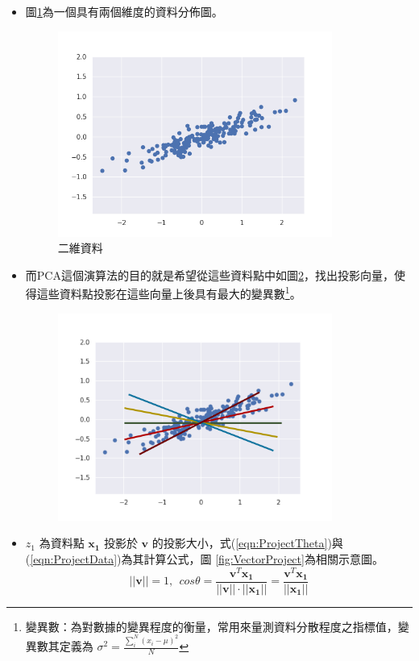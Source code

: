 \begin{itemize}
	\item
	      圖\ref{fig:PcaDemostrate}為一個具有兩個維度的資料分佈圖。


	      \begin{figure}[h]
		      \centering
		      \includegraphics[width=9cm]{pic/pca_demostrate.png}
		      \caption{二維資料}
		      \label{fig:PcaDemostrate}
	      \end{figure}


	      \newpage
	\item
	      而PCA這個演算法的目的就是希望從這些資料點中如圖\ref{fig:PcaVectorToFind}，找出投影向量，使得這些資料點投影在這些向量上後具有最大的變異數\footnote{\noindent 變異數：為對數據的變異程度的衡量，常用來量測資料分散程度之指標值，變異數其定義為 \(\sigma^2=\frac{{}\sum^{N}_{i}(x_i-\mu )^2}{N}\) }。
	      \begin{figure}[h]
		      \centering
		      \includegraphics[width=9cm]{./pic/iVu9zQYG.png}
		      \caption{}
		      \label{fig:PcaVectorToFind}
	      \end{figure}
	\item
		\(z_1\) 為資料點 \(\mathbf{x_1}\) 投影於 \(\mathbf{v}\) 的投影大小，式(\ref{eqn:ProjectTheta})與(\ref{eqn:ProjectData})為其計算公式，圖 \ref{fig:VectorProject}為相關示意圖。
		      \begin{equation}
		      \label{eqn:ProjectTheta}
				  ||\mathbf{v}|| = 1, \ \ cos \theta  = \frac{\mathbf{v}^T\mathbf{x_1}}{||\mathbf{v}|| \cdot ||\mathbf{x_1}||}= \frac{\mathbf{v}^T\mathbf{x_1}}{||\mathbf{x_1}||}
		      \end{equation}


\end{itemize}
